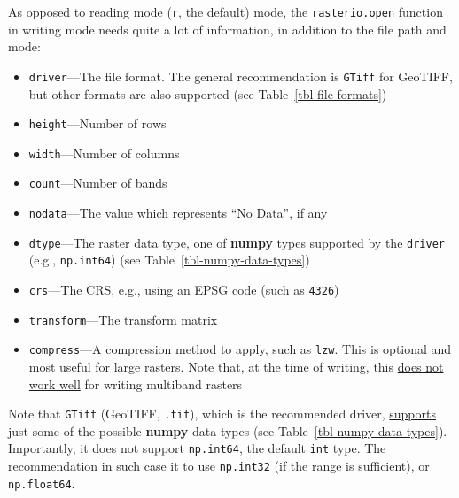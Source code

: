 \documentclass[
  letterpaper,
]{krantz}
\providecommand{\tightlist}{%
  \setlength{\itemsep}{0pt}\setlength{\parskip}{0pt}}\usepackage{longtable,booktabs,array}
\begin{document}
As opposed to reading mode
(\texttt{\textquotesingle{}r\textquotesingle{}}, the default) mode, the
\texttt{rasterio.open} function in writing mode needs quite a lot of
information, in addition to the file path and mode:

\begin{itemize}
\tightlist
\item
  \texttt{driver}---The file format. The general recommendation is
  \texttt{\textquotesingle{}GTiff\textquotesingle{}} for GeoTIFF, but
  other formats are also supported (see Table~\ref{tbl-file-formats})
\item
  \texttt{height}---Number of rows
\item
  \texttt{width}---Number of columns
\item
  \texttt{count}---Number of bands
\item
  \texttt{nodata}---The value which represents ``No Data'', if any
\item
  \texttt{dtype}---The raster data type, one of \textbf{numpy} types
  supported by the \texttt{driver} (e.g., \texttt{np.int64}) (see
  Table~\ref{tbl-numpy-data-types})
\item
  \texttt{crs}---The CRS, e.g., using an EPSG code (such as
  \texttt{4326})
\item
  \texttt{transform}---The transform matrix
\item
  \texttt{compress}---A compression method to apply, such as
  \texttt{\textquotesingle{}lzw\textquotesingle{}}. This is optional and
  most useful for large rasters. Note that, at the time of writing, this
  \href{https://gis.stackexchange.com/questions/404738/why-does-rasterio-compression-reduces-image-size-with-single-band-but-not-with-m}{does
  not work well} for writing multiband rasters
\end{itemize}

\begin{tcolorbox}[enhanced jigsaw, title=\textcolor{quarto-callout-note-color}{\faInfo}\hspace{0.5em}{Note}, arc=.35mm, toprule=.15mm, titlerule=0mm, colframe=quarto-callout-note-color-frame, breakable, toptitle=1mm, bottomtitle=1mm, rightrule=.15mm, colbacktitle=quarto-callout-note-color!10!white, leftrule=.75mm, left=2mm, bottomrule=.15mm, opacityback=0, coltitle=black, opacitybacktitle=0.6, colback=white]

Note that \texttt{\textquotesingle{}GTiff} (GeoTIFF, \texttt{.tif}),
which is the recommended driver,
\href{https://gdal.org/drivers/raster/gtiff.html}{supports} just some of
the possible \textbf{numpy} data types (see
Table~\ref{tbl-numpy-data-types}). Importantly, it does not support
\texttt{np.int64}, the default \texttt{int} type. The recommendation in
such case it to use \texttt{np.int32} (if the range is sufficient), or
\texttt{np.float64}.

\end{tcolorbox}
\end{document}
